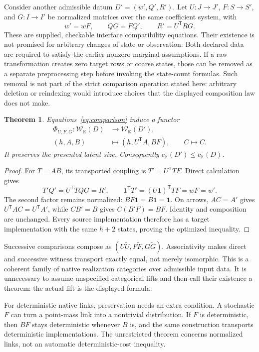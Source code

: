 \documentclass[11pt]{article}
\newcommand{\K}{\mathbb K}
\newcommand{\one}{\mathbf 1}
\newcommand{\W}{\mathcal W}
\newtheorem{theorem}{Theorem}[section]
\theoremstyle{remark}
\begin{document}
Consider another admissible datum $D'=(w',Q',R')$. Let $U:J\to J'$, $F:S\to S'$, and $G:I\to I'$ be normalized matrices over the same coefficient system, with
\begin{equation}\label{eq:comparison}
 w'=wF,\qquad QG=FQ',\qquad R'=U^{\mathsf T}RG.
\end{equation}
These are supplied, checkable interface compatibility equations. Their existence is not promised for arbitrary changes of state or observation. Both declared data are required to satisfy the earlier nonzero-marginal assumptions. If a raw transformation creates zero target rows or coarse states, those can be removed as a separate preprocessing step before invoking the state-count formulas. Such removal is not part of the strict comparison operation stated here: arbitrary deletion or reindexing would introduce choices that the displayed composition law does not make.

\begin{theorem}\label{thm:transport}
Equations~\eqref{eq:comparison} induce a functor
\begin{align*}
 \Phi_{U,F,G}:\W_\K(D)&\longrightarrow\W_\K(D'),\\
 (h,A,B)&\longmapsto(h,U^{\mathsf T}A,BF),\qquad C\longmapsto C.
\end{align*}
It preserves the presented latent size. Consequently $c_\K(D')\le c_\K(D)$.
\end{theorem}
\begin{proof}
For $T=AB$, its transported coupling is $T'=U^{\mathsf T}TF$. Direct calculation gives
\[
 T'Q'=U^{\mathsf T}TQG=R',\qquad
 \one^{\mathsf T}T'=(U\one)^{\mathsf T}TF=wF=w'.
\]
The second factor remains normalized: $BF\one=B\one=\one$. On arrows, $AC=A'$ gives $U^{\mathsf T}AC=U^{\mathsf T}A'$, while $CB'=B$ gives $C(B'F)=BF$. Identity and composition are unchanged. Every source implementation therefore has a target implementation with the same $h+2$ states, proving the optimized inequality.
\end{proof}

Successive comparisons compose as $(U\widetilde U,F\widetilde F,G\widetilde G)$. Associativity makes direct and successive witness transport exactly equal, not merely isomorphic. This is a coherent family of native realization categories over admissible input data. It is unnecessary to assume unspecified categorical lifts and then call their existence a theorem: the actual lift is the displayed formula.

For deterministic native links, preservation needs an extra condition. A stochastic $F$ can turn a point-mass link into a nontrivial distribution. If $F$ is deterministic, then $BF$ stays deterministic whenever $B$ is, and the same construction transports deterministic implementations. The unrestricted theorem concerns normalized links, not an automatic deterministic-cost inequality.
\end{document}
